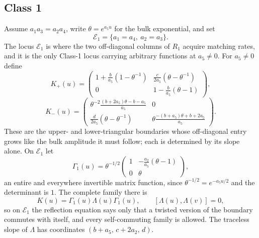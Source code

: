 \documentclass[11pt,reqno]{amsart}
\theoremstyle{plain}
\theoremstyle{definition}
\theoremstyle{remark}
\numberwithin{equation}{section}
\begin{document}
\subsection{Class 1}
\label{subsec:c1}

Assume $a_1a_3=a_2a_4$, write $\theta=e^{a_5u}$ for the bulk exponential, and set
\begin{equation}
\mathcal E_1=\{a_1=a_4,\ a_2=a_3\}.
\label{eq:C1-E1}
\end{equation}
The locus $\mathcal E_1$ is where the two off-diagonal columns of $R_1$ acquire
matching rates, and it is the only Class-1 locus carrying arbitrary functions at
$a_5\ne0$. For $a_5\ne0$ define
\begin{equation}
K_+(u)=\begin{pmatrix}
1+\frac b{a_5}(1-\theta^{-1})&\frac c{2a_5}(\theta-\theta^{-1})\\
0&1-\frac b{a_5}(\theta-1)
\end{pmatrix},                                      \label{eq:C1-plus}
\end{equation}
\begin{equation}
K_-(u)=\begin{pmatrix}
\theta^{-2}\frac{(b+2a_5)\theta-b-a_5}{a_5}&0\\
\frac d{2a_5}(\theta-\theta^{-1})&
\theta\frac{-(b+a_5)\theta+b+2a_5}{a_5}
\end{pmatrix}.                                      \label{eq:C1-minus}
\end{equation}
These are the upper- and lower-triangular boundaries whose off-diagonal entry
grows like the bulk amplitude it must follow; each is determined by its slope
alone. On $\mathcal E_1$ let
\begin{equation}
\Gamma_1(u)=\theta^{-1/2}
\begin{pmatrix}1&-\frac{a_2}{a_5}(\theta-1)\\0&\theta\end{pmatrix},
\label{eq:C1-twist}
\end{equation}
an entire and everywhere invertible matrix function, since $\theta^{-1/2}
=e^{-a_5u/2}$ and the determinant is $1$. The complete family there is
\begin{equation}
K(u)=\Gamma_1(u)\Lambda(u)\Gamma_1(u),\qquad [\Lambda(u),\Lambda(v)]=0,
\label{eq:C1-factor-nz}
\end{equation}
so on $\mathcal E_1$ the reflection equation says only that a twisted version of
the boundary commutes with itself, and every self-commuting family is allowed.
The traceless slope of $\Lambda$ has coordinates $(b+a_5,\,c+2a_2,\,d)$.
\end{document}
